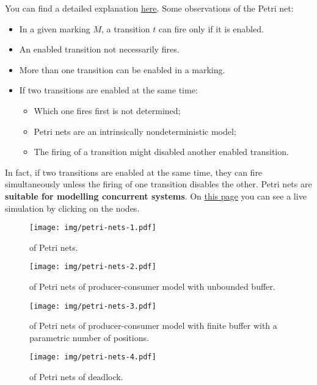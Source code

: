 \highspace
You can find a detailed explanation \href{https://isr.umd.edu/Labs/CIM/miscs/wmsor97.pdf}{here}. Some observations of the Petri net:
\begin{itemize}
    \item In a given marking $M$, a transition $t$ can fire only if it is enabled.

    \item An enabled transition not necessarily fires.

    \item More than one transition can be enabled in a marking.

    \item If two transitions are enabled at the same time:
    \begin{itemize}
        \item Which one fires first is not determined;
        \item Petri nets are an intrinsically nondeterministic model;
        \item The firing of a transition might disabled another enabled transition.
    \end{itemize}
\end{itemize}
In fact, if two transitions are enabled at the same time, they can fire simultaneously unless the firing of one transition disables the other. Petri nets are \textbf{suitable for modelling concurrent systems}. On \href{http://petrinet.org/}{this page} you can see a live simulation by clicking on the nodes.

\newpage

\begin{figure}[!htp]
    \centering
    \texttt{[image: img/petri-nets-1.pdf]}
    \caption{ of Petri nets.}
\end{figure}

\begin{figure}[!htp]
    \centering
    \texttt{[image: img/petri-nets-2.pdf]}
    \caption{ of Petri nets of producer-consumer model with unbounded buffer.}
\end{figure}

\newpage

\begin{figure}[!htp]
    \centering
    \texttt{[image: img/petri-nets-3.pdf]}
    \caption{ of Petri nets of producer-consumer model with finite buffer with a parametric number of positions.}
\end{figure}

\begin{figure}[!htp]
    \centering
    \texttt{[image: img/petri-nets-4.pdf]}
    \caption{ of Petri nets of deadlock.}
\end{figure}